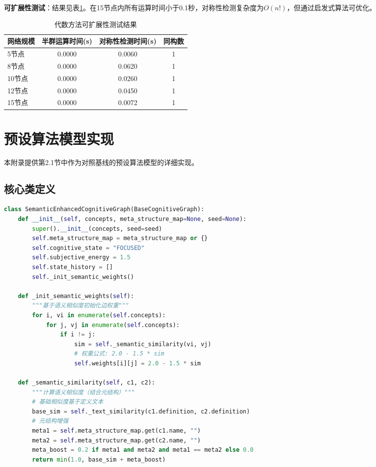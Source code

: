 \documentclass[12pt,a4paper]{article}
\begin{document}
\textbf{可扩展性测试}：结果见表\ref{tab:app_scalability}。在15节点内所有运算时间小于0.1秒，对称性检测复杂度为$O(n!)$，但通过启发式算法可优化。

\begin{table}[H]
\centering
\caption{代数方法可扩展性测试结果}
\label{tab:app_scalability}
\begin{tabular}{lccc}
\toprule
\textbf{网络规模} & \textbf{半群运算时间(s)} & \textbf{对称性检测时间(s)} & \textbf{同构数} \\
\midrule
5节点 & 0.0000 & 0.0060 & 1 \\
8节点 & 0.0000 & 0.0620 & 1 \\
10节点 & 0.0000 & 0.0260 & 1 \\
12节点 & 0.0000 & 0.0450 & 1 \\
15节点 & 0.0000 & 0.0072 & 1 \\
\bottomrule
\end{tabular}
\end{table}

\section{预设算法模型实现}
\label{app:preset_model}

本附录提供第2.1节中作为对照基线的预设算法模型的详细实现。

\subsection{核心类定义}

\begin{lstlisting}[language=Python, caption=预设算法模型主类]
class SemanticEnhancedCognitiveGraph(BaseCognitiveGraph):
    def __init__(self, concepts, meta_structure_map=None, seed=None):
        super().__init__(concepts, seed=seed)
        self.meta_structure_map = meta_structure_map or {}
        self.cognitive_state = "FOCUSED"
        self.subjective_energy = 1.5
        self.state_history = []
        self._init_semantic_weights()
        
    def _init_semantic_weights(self):
        """基于语义相似度初始化边权重"""
        for i, vi in enumerate(self.concepts):
            for j, vj in enumerate(self.concepts):
                if i != j:
                    sim = self._semantic_similarity(vi, vj)
                    # 权重公式: 2.0 - 1.5 * sim
                    self.weights[i][j] = 2.0 - 1.5 * sim
    
    def _semantic_similarity(self, c1, c2):
        """计算语义相似度（结合元结构）"""
        # 基础相似度基于定义文本
        base_sim = self._text_similarity(c1.definition, c2.definition)
        # 元结构增强
        meta1 = self.meta_structure_map.get(c1.name, "")
        meta2 = self.meta_structure_map.get(c2.name, "")
        meta_boost = 0.2 if meta1 and meta2 and meta1 == meta2 else 0.0
        return min(1.0, base_sim + meta_boost)
\end{lstlisting}
\end{document}
